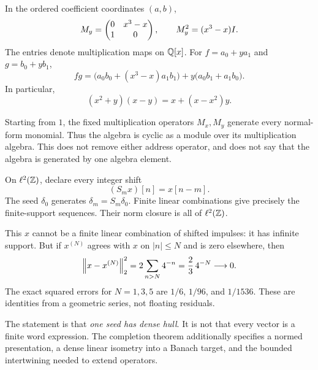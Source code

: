 
In the ordered coefficient coordinates $(a,b)$,
\[
M_y=\begin{pmatrix}0&x^3-x\\1&0\end{pmatrix},\qquad M_y^2=(x^3-x)I.
\]
The entries denote multiplication maps on $\mathbb Q[x]$. For $f=a_0+ya_1$ and $g=b_0+yb_1$,
\[
fg=\bigl(a_0b_0+(x^3-x)a_1b_1\bigr)
+y\bigl(a_0b_1+a_1b_0\bigr).
\]
In particular,
\[
(x^2+y)(x-y)=x+(x-x^2)y.
\]

Starting from $1$, the fixed multiplication operators $M_x,M_y$ generate every normal-form monomial. Thus the algebra is cyclic as a module over its multiplication algebra. This does not remove either address operator, and does not say that the algebra is generated by one algebra element.


On $\ell^2(\mathbb Z)$, declare every integer shift
\[
(S_mx)[n]=x[n-m].
\]
The seed $\delta_0$ generates $\delta_m=S_m\delta_0$. Finite linear combinations give precisely the finite-support sequences. Their norm closure is all of $\ell^2(\mathbb Z)$.


This $x$ cannot be a finite linear combination of shifted impulses: it has infinite support. But if $x^{(N)}$ agrees with $x$ on $|n|\le N$ and is zero elsewhere, then
\[
\left\lVert x-x^{(N)}\right\rVert_2^2
=2\sum_{n>N}4^{-n}
=\frac{2}{3}\,4^{-N}\longrightarrow0.
\]
The exact squared errors for $N=1,3,5$ are $1/6$, $1/96$, and $1/1536$. These are identities from a geometric series, not floating residuals.

The statement is that \emph{one seed has dense hull}. It is not that every vector is a finite word expression. The completion theorem additionally specifies a normed presentation, a dense linear isometry into a Banach target, and the bounded intertwining needed to extend operators.

